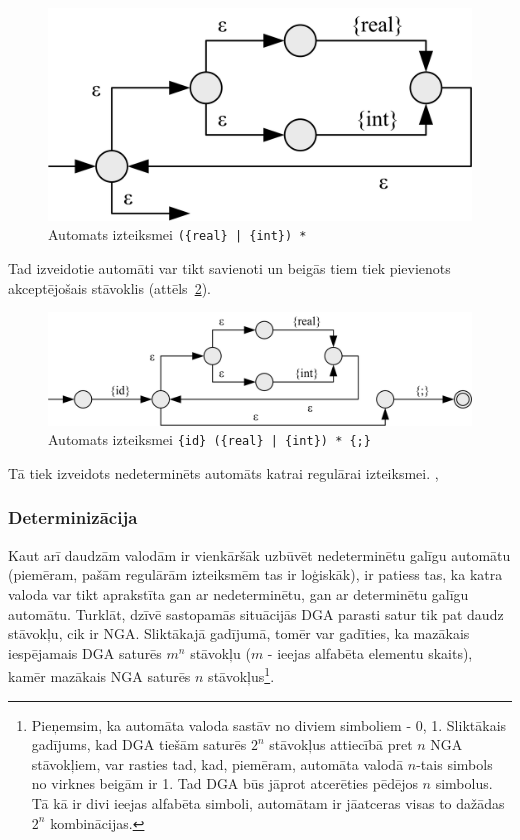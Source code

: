 \begin{figure}[H]
  \centering
    \includegraphics[scale=1.5]{pictures/auto_asterisk_ex}
  \caption{\label{fig:auto_asterisk_ex}Automats izteiksmei \texttt{(\{real\} | \{int\}) *}}
\end{figure}

Tad izveidotie automāti var tikt savienoti un beigās tiem tiek pievienots akceptējošais stāvoklis (attēls~\ref{fig:auto_full_ex}).

\begin{figure}[H]
  \centering
    \includegraphics[scale=1.25]{pictures/auto_full_ex}
  \caption{\label{fig:auto_full_ex}Automats izteiksmei \texttt{\{id\} (\{real\} | \{int\}) * \{;\}}}
\end{figure}

Tā tiek izveidots nedeterminēts automāts katrai regulārai izteiksmei. \cite{Cox:RegexpMatchingFast}, \cite{DragonBook}

\subsubsection{Determinizācija}

Kaut arī daudzām valodām ir vienkāršāk uzbūvēt nedeterminētu galīgu automātu (piemēram, pašām regulārām izteiksmēm tas ir loģiskāk), ir patiess tas, ka katra valoda var tikt aprakstīta gan ar nedeterminētu, gan ar determinētu galīgu automātu. Turklāt, dzīvē sastopamās situācijās DGA parasti satur tik pat daudz stāvokļu, cik ir NGA. Sliktākajā gadījumā, tomēr var gadīties, ka mazākais iespējamais DGA saturēs $m^n$ stāvokļu ($m$ - ieejas alfabēta elementu skaits), kamēr mazākais NGA saturēs $n$ stāvokļus\footnote{Pieņemsim, ka automāta valoda sastāv no diviem simboliem - {0, 1}. Sliktākais gadījums, kad DGA tiešām saturēs $2^n$ stāvokļus attiecībā pret $n$ NGA stāvokļiem, var rasties tad, kad, piemēram, automāta valodā $n$-tais simbols no virknes beigām ir 1. Tad DGA būs jāprot atcerēties pēdējos $n$ simbolus. Tā kā ir divi ieejas alfabēta simboli, automātam ir jāatceras visas to dažādas $2^n$ kombinācijas.}.


